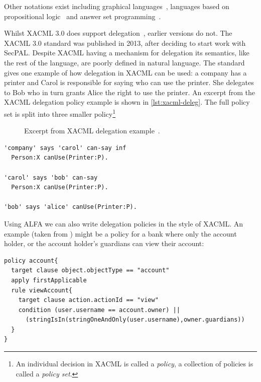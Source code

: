 \documentclass[thesis.tex]{subfiles}
\begin{document}
Other notations exist including graphical
languages~\cite{henrik_nergaard_scratch-based_2015}, languages based on
propositional logic~\cite{zhang_synthesising_2004} and answer set
programming~\cite{ramli_xacml_2012}.

Whilst XACML 3.0 does support delegation~\cite{oasis_xacml_2010}, earlier
versions do not. The XACML 3.0 standard was published in 2013, after deciding to
start work with SecPAL. Despite XACML having a mechanism for delegation its
semantics, like the rest of the language, are poorly defined in natural
language. The standard gives one example of how delegation in XACML can be used:
a company has a printer and Carol is responsible for saying who can use the
printer. She delegates to Bob who in turn grants Alice the right to use the
printer. An excerpt from the XACML delegation policy example is shown in
\autoref{lst:xacml-deleg}. The full policy set is split into three smaller
policy\footnote{An individual decision in XACML is called a \emph{policy}, a
collection of policies is called a \emph{policy set}.}

\begin{figure}
  \begin{minipage}{1\textwidth}
      
  \end{minipage}
  \caption[Excerpt from XACML delegation example.]{Excerpt from XACML delegation example~\cite{oasis_xacml_2010}.}
  \label{lst:xacml-deleg}
\end{figure}

\begin{lstlisting}
'company' says 'carol' can-say inf
  Person:X canUse(Printer:P).

'carol' says 'bob' can-say
  Person:X canUse(Printer:P).

'bob' says 'alice' canUse(Printer:P).
\end{lstlisting}

Using ALFA we can also write delegation policies in the style of
XACML.  An example (taken from \cite{axiomatics_going_2016}) might be
a policy for a bank where only the account holder, or the account
holder's guardians can view their account:

\begin{lstlisting}
policy account{ 
  target clause object.objectType == "account"
  apply firstApplicable
  rule viewAccount{ 
    target clause action.actionId == "view"
    condition (user.username == account.owner) ||
      (stringIsIn(stringOneAndOnly(user.username),owner.guardians))
  }
}
\end{lstlisting}
\end{document}
